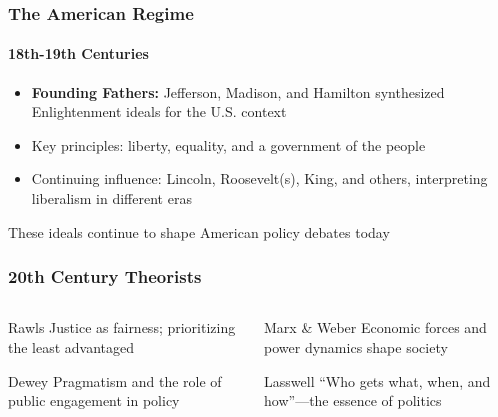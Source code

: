 \documentclass[10pt]{beamer}
\begin{document}
\begin{frame}
\frametitle{The American Regime}
\framesubtitle{18th-19th Centuries}

\begin{block}{}
\begin{itemize}
\item<1-> \textbf{Founding Fathers:} Jefferson, Madison, and Hamilton synthesized Enlightenment ideals for the U.S. context
\item<2-> Key principles: liberty, equality, and a government of the people
\item<3-> Continuing influence: Lincoln, Roosevelt(s), King, and others, interpreting liberalism in different eras
\end{itemize}
\end{block}

\pause
\vspace{0.5cm}
\centering
These ideals continue to shape American policy debates today

\end{frame}

\begin{frame}
\frametitle{20th Century Theorists}

\begin{columns}
\begin{column}{0.48\textwidth}
\begin{block}{Rawls}
\pause
Justice as fairness; prioritizing the least advantaged
\end{block}

\vspace{0.3cm}

\begin{block}{Dewey}
\pause
Pragmatism and the role of public engagement in policy
\end{block}
\end{column}

\begin{column}{0.48\textwidth}
\begin{block}{Marx \& Weber}
\pause
Economic forces and power dynamics shape society
\end{block}

\vspace{0.3cm}

\begin{block}{Lasswell}
\pause
``Who gets what, when, and how''---the essence of politics
\end{block}
\end{column}
\end{columns}

\end{frame}
\end{document}
